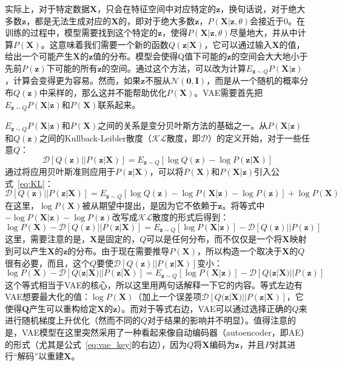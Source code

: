 实际上，对于特定数据$\bm X$，只会在特征空间中对应特定的$\bm z$，换句话说，对于绝大多数$\bm z$，都是无法生成对应的$\bm X$的，即对于绝大多数$\bm z$，$P(\bm X|\bm z, \theta)$会接近于0。在训练的过程中，模型需要找到这个特定的$\bm z$，使得$P(\bm X|\bm z, \theta)$尽量地大，并从中计算$P(\bm X)$。这意味着我们需要一个新的函数$Q(\bm z|\bm X)$，它可以通过输入$\bm X$的值，给出一个可能产生$\bm X$的$\bm z$值的分布。模型会使得Q值下可能的$\bm z$的空间会大大地小于先前$P(\bm z)$下可能的所有$\bm z$的空间。通过这个方法，可以改为计算$E_{\bm z\sim Q}P(\bm X|\bm z)$，计算会变得更为容易。然而，如果$\bm z$不服从$\mathcal N(\bm 0, \bm I)$，而是从一个随机的概率分布$Q(\bm z)$中采样的，那么这并不能帮助优化$P(\bm X)$。VAE需要首先把$E_{\bm z\sim Q}P(\bm X|\bm z)$和$P(\bm X)$联系起来。\par

$E_{\bm z\sim Q}P(\bm X|\bm z)$和$P(\bm X)$之间的关系是变分贝叶斯方法的基础之一。从$P(\bm X|\bm z)$和$Q(\bm z)$之间的Kullback-Leibler散度（$\mathcal{KL}$散度，即$\mathcal D$）的定义开始，对于一些任意$Q$：
\begin{equation}
\label{eq:KL}
\mathcal D{[Q(\bm z)||P(\bm z|\bm X)]} = E_{\bm z\sim Q}{[\log Q(\bm z)-\log P(\bm z|\bm X)]}
\end{equation}
通过将应用贝叶斯准则应用于$P(\bm z|\bm X)$，可以将$P(\bm X)$和$P(\bm X|\bm z)$引入公式~\ref{eq:KL}：
\begin{equation}
\label{eq:KL1}
\mathcal D{[Q(\bm z)||P(\bm z|\bm X)]} = E_{\bm z\sim Q}{[\log Q(\bm z)-\log P(\bm X|\bm z) - \log P(\bm z)]} + \log P(\bm X)
\end{equation}
在这里，$\log P(\bm X)$被从期望中提出，是因为它不依赖于$\bm z$。将等式中$-\log P(\bm X|\bm z) - \log P(\bm z)$改写成$\mathcal{KL}$散度的形式后得到：
\begin{equation}
\label{eq:KL2}
\log P(\bm X) - \mathcal D{[Q(\bm z)||P(\bm z|\bm X)]} = E_{\bm z\sim Q}{[\log P(\bm X|\bm z)]} - \mathcal D{[Q(\bm z)||P(\bm z)]}
\end{equation}
这里，需要注意的是，$\bm X$是固定的，$Q$可以是任何分布，而不仅仅是一个将$\bm X$映射到可以产生$\bm X$的$\bm z$的分布。由于现在需要推导$P(\bm X)$，所以构造一个取决于$\bm X$的$Q$很有必要，而且，这个$Q$要使$\mathcal D{[Q(\bm z)||P(\bm z|\bm X)]}$变小：
\begin{equation}
\label{eq:vae_key}
\log P(\bm X) - \mathcal D{[Q(\bm z|\bm X)||P(\bm z|\bm X)]} = E_{\bm z\sim Q}{[\log P(\bm X|\bm z)]} - \mathcal D{[Q(\bm z|\bm X)||P(\bm z)]}
\end{equation}
这个等式相当于VAE的核心，所以这里用两句话解释一下它的内容。等式左边有VAE想要最大化的值：$\log P(\bm X)$（加上一个误差项$\mathcal D{[Q(\bm z|\bm X)||P(\bm z|\bm X)]}$，它使得$\bm Q$产生可以重构给定$\bm X$的$\bm z$）。而对于等式右边，VAE可以通过选择正确的$Q$来进行随机梯度上升优化（然而不同的$Q$对于结果的影响并不明显）。值得注意的是，VAE模型在这里突然采用了一种看起来像自动编码器（autoencoder，即AE）的形式（尤其是公式~\ref{eq:vae_key}的右边），因为$Q$将$\bm X$编码为$\bm z$，并且$P$对其进行“解码”以重建$\bm X$。\par

